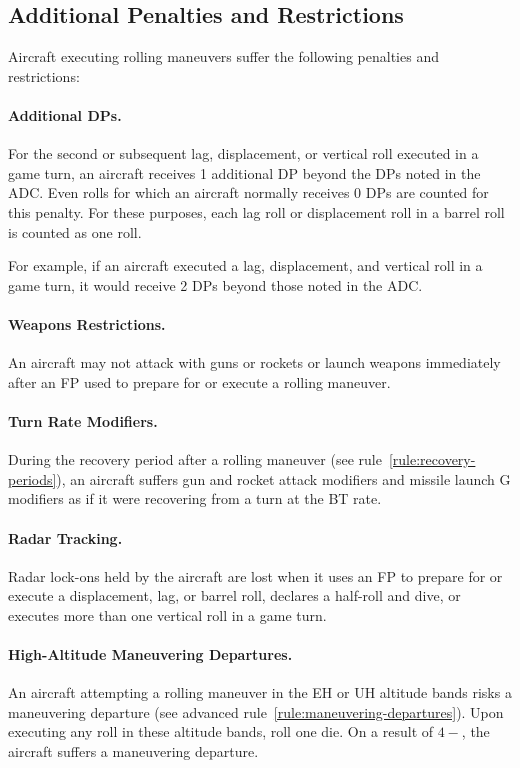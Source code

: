 {\subsection{Additional Penalties and Restrictions}

Aircraft executing rolling maneuvers suffer the following penalties and restrictions:

\paragraph{Additional DPs.} 
For the second or subsequent lag, displacement, or vertical roll executed in a game turn, an aircraft receives 1 additional DP beyond the DPs noted in the ADC. Even rolls for which an aircraft normally receives 0 DPs are counted for this penalty. For these purposes, each lag roll or displacement roll in a barrel roll is counted as one roll.

For example, if an aircraft executed a lag, displacement, and vertical roll in a game turn, it would receive 2 DPs beyond those noted in the ADC.

\paragraph{Weapons Restrictions.} An aircraft may not attack with guns or rockets or launch weapons immediately after an FP used to prepare for or execute a rolling maneuver.

\paragraph{Turn Rate Modifiers.} During the recovery period after a rolling maneuver (see rule~\ref{rule:recovery-periods}), an aircraft suffers gun and rocket attack modifiers and missile launch G modifiers as if it were recovering from a turn at the BT rate.

\paragraph{Radar Tracking.} Radar lock-ons held by the aircraft are lost when it uses an FP to prepare for or execute a displacement, lag, or barrel roll, declares a half-roll and dive, or executes more than one vertical roll in a game turn.

\paragraph{High-Altitude Maneuvering Departures.} An aircraft attempting a rolling maneuver in the EH or UH altitude bands risks a maneuvering departure (see advanced rule~\ref{rule:maneuvering-departures}). Upon executing any roll in these altitude bands,  roll one die. On a result of $4-$, the aircraft suffers a maneuvering departure.
}

